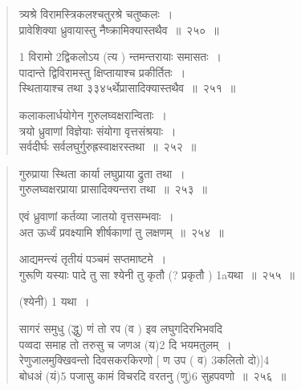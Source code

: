 \documentclass[11pt, openany]{book}
\begin{document}
\newpage

\begin{quote}
{\na त्र्यश्रे विरामस्त्रिकलश्चतुरश्रे चतुष्कलः~। \\
प्रावेशिक्या ध्रुवायास्तु नैष्क्रामिक्यास्तथैव~॥~२५०~॥

1 विरामो 2द्विकलोऽय (त्य ) न्तमन्तरायाः समासतः~।\\
पादान्ते द्विविरामस्तु क्षिप्तायाश्च प्रकीर्तितः~। \\
स्थितायाश्च तथा ३३४५र्थेप्रासादिक्यास्तथैव~॥~२५१~॥

कलाकलार्धयोगेन गुरुलघ्वक्षरान्विताः~। \\
त्रयो ध्रुवाणां विज्ञेयाः संयोगा वृत्तसंश्रयाः~। \\
सर्वदीर्घः सर्वलघुर्गुरुह्रस्वाक्षरस्तथा~॥~२५२~॥}
\end{quote}
 
\newpage

\begin{quote}
{\na गुरुप्राया स्थिता कार्या लघुप्राया द्रुता तथा~। \\
गुरुलघ्वक्षरप्राया प्रासादिक्यन्तरा तथा~॥~२५३~॥ 

एवं ध्रुवाणां कर्तव्या जातयो वृत्तसम्भवाः~। \\
अत ऊर्ध्वं प्रवक्ष्यामि शीर्षकाणां तु लक्षणम्~॥~२५४~॥

आद्यमन्त्यं तृतीयं पञ्चमं सप्तमाष्टमे~। \\
गुरूणि यस्याः पादे तु सा श्येनी तु कृतौ (? प्रकृतौ ) 1aयथा~॥~२५५~॥}

(श्येनी) 1 यथा~।

{\na सागरं समुधु (द्धु) णं तो रप (व ) इव लघुगदिरभिभवदि \\
पव्वदा समाह तो तरुसु च जणअ (य)2 दि भयमतुलम्~।\\
रेणुजालमुक्खिवन्तो दिवसकरकिरणो [ ण उप ( व) 3कलितो दो)]4\\
बोधअं (यं)5 पजासु कामं विचरदि वरतनु (णु)6 सुहपवणो~॥~२५६~॥}
\end{quote}


\newpage

\begin{quote}

\end{quote}
{ }
\end{document}
